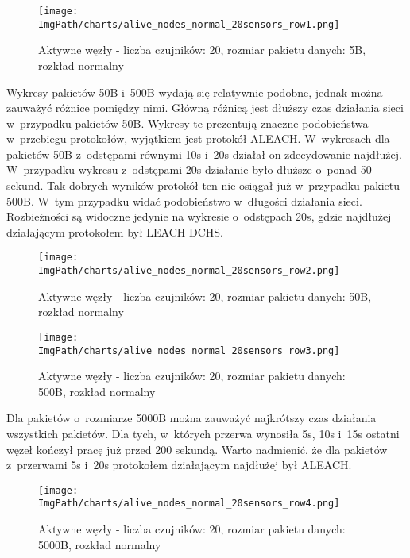 \begin{figure}[H]
	\begin{center}
		\texttt{[image: \\ImgPath/charts/alive\_nodes\_normal\_20sensors\_row1.png]}
	\end{center}
	\caption{Aktywne węzły - liczba czujników: 20, rozmiar pakietu danych: 5B, rozkład normalny}
\end{figure}

Wykresy pakietów 50B i~500B wydają się relatywnie podobne, jednak można zauważyć różnice pomiędzy nimi. Główną różnicą jest dłuższy czas działania sieci w~przypadku pakietów 50B. Wykresy te prezentują znaczne podobieństwa w~przebiegu protokołów, wyjątkiem jest protokół ALEACH. W~wykresach dla pakietów 50B z~odstępami równymi 10s i~20s działał on zdecydowanie najdłużej. W~przypadku wykresu z~odstępami 20s działanie było dłuższe o~ponad 50 sekund. Tak dobrych wyników protokół ten nie osiągał już w~przypadku pakietu 500B. W~tym przypadku widać podobieństwo w~długości działania sieci. Rozbieżności są widoczne jedynie na wykresie o~odstępach 20s, gdzie najdłużej działającym protokołem był LEACH DCHS. 

\begin{figure}[H]
	\begin{center}
		\texttt{[image: \\ImgPath/charts/alive\_nodes\_normal\_20sensors\_row2.png]}
	\end{center}
	\caption{Aktywne węzły - liczba czujników: 20, rozmiar pakietu danych: 50B, rozkład normalny}
\end{figure}

\begin{figure}[H]
	\begin{center}
		\texttt{[image: \\ImgPath/charts/alive\_nodes\_normal\_20sensors\_row3.png]}
	\end{center}
	\caption{Aktywne węzły - liczba czujników: 20, rozmiar pakietu danych: 500B, rozkład normalny}
\end{figure}

Dla pakietów o~rozmiarze 5000B można zauważyć najkrótszy czas działania wszystkich pakietów. Dla tych, w~których przerwa wynosiła 5s, 10s i~15s ostatni węzeł kończył pracę już przed 200 sekundą. Warto nadmienić, że dla pakietów z~przerwami 5s i~20s protokołem działającym najdłużej był ALEACH. 

\begin{figure}[H]
	\begin{center}
		\texttt{[image: \\ImgPath/charts/alive\_nodes\_normal\_20sensors\_row4.png]}
	\end{center}
	\caption{Aktywne węzły - liczba czujników: 20, rozmiar pakietu danych: 5000B, rozkład normalny}
\end{figure}
 

